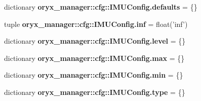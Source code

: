 \begin{DoxyCompactItemize}
\item 
dictionary {\bf oryx\-\_\-manager\-::cfg\-::\-I\-M\-U\-Config.\-defaults} = \{\}
\item 
tuple {\bf oryx\-\_\-manager\-::cfg\-::\-I\-M\-U\-Config.\-inf} = float('inf')
\item 
dictionary {\bf oryx\-\_\-manager\-::cfg\-::\-I\-M\-U\-Config.\-level} = \{\}
\item 
dictionary {\bf oryx\-\_\-manager\-::cfg\-::\-I\-M\-U\-Config.\-max} = \{\}
\item 
dictionary {\bf oryx\-\_\-manager\-::cfg\-::\-I\-M\-U\-Config.\-min} = \{\}
\item 
dictionary {\bf oryx\-\_\-manager\-::cfg\-::\-I\-M\-U\-Config.\-type} = \{\}
\end{DoxyCompactItemize}
